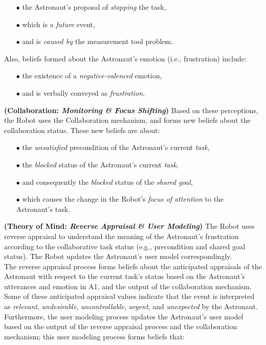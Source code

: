 \begin{itemize}
  \item[$\bullet$] the Astronaut's proposal of \textit{stopping} the task,
  \item[$\bullet$] which is a \textit{future} event,
  \item[$\bullet$] and is \textit{caused by} the measurement tool problem.
\end{itemize}

\noindent Also, beliefs formed about the Astronaut's emotion (i.e., frustration)
include:

\begin{itemize}
  \item[$\bullet$] the existence of a \textit{negative-valenced} emotion,
  \item[$\bullet$] and is verbally conveyed as \textit{frustration}.\\
\end{itemize}

\noindent\textbf{(Collaboration: \textit{Monitoring \& Focus Shifting})}
Based on these perceptions, the Robot uses the Collaboration mechanism, and
forms new beliefs about the collaboration status. These new beliefs are about:

\begin{itemize}
  \item[$\bullet$] the \textit{unsatisfied} precondition of the Astronaut's
  current \textit{task},
  \item[$\bullet$] the \textit{blocked} status of the Astronaut's current
  \textit{task},
  \item[$\bullet$] and consequently the \textit{blocked} status of the
  \textit{shared goal},
  \item[$\bullet$] which causes the change in the Robot's \textit{focus of
  attention} to the Astronaut's task.
\end{itemize}

\noindent \textbf{(Theory of Mind: \textit{Reverse Appraisal \& User
Modeling})} The Robot uses reverse appraisal to understand the meaning of the
Astronaut's frustration according to the collaborative task status (e.g.,
precondition and shared goal status). The Robot updates the Astronaut's user
model correspondingly.\\

The reverse appraisal process forms beliefs about the anticipated appraisals of
the Astronaut with respect to the current task's status based on the Astronaut's
utterances and emotion in A1, and the output of the collaboration mechanism.
Some of these anticipated appraisal values indicate that the event is
interpreted as \textit{relevant}, \textit{undesirable}, \textit{uncontrollable},
\textit{urgent}, and \textit{unexpected} by the Astronaut. Furthermore, the user
modeling process updates the Astronaut's user model based on the output of the
reverse appraisal process and the collaboration mechanism; this user modeling
process forms beliefs that:

